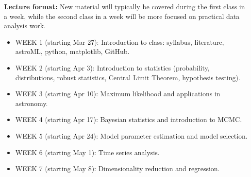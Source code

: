 \documentclass[10pt]{article}
\begin{document}
{\bf Lecture format:}
New material will typically be covered during the first class in a week, while
the second class in a week will be more focused on practical data analysis work. 

\newpage 
\begin{itemize}
\item WEEK 1 (starting Mar 27): 
      Introduction to class: syllabus, literature, astroML, python, matplotlib, GitHub. 
\item WEEK  2 (starting Apr 3): Introduction to statistics (probability, distributions, 
             robust statistics, Central Limit Theorem,  hypothesis testing).
\item WEEK  3 (starting Apr 10):  Maximum likelihood and applications in astronomy.
\item WEEK  4 (starting Apr 17):  Bayesian statistics and introduction to MCMC.
\item WEEK  5 (starting Apr 24):  Model parameter estimation and model selection.

\item WEEK  6 (starting May 1):   Time series analysis.

\item WEEK  7 (starting May 8): Dimensionality reduction and regression.


\end{itemize}
\end{document}

